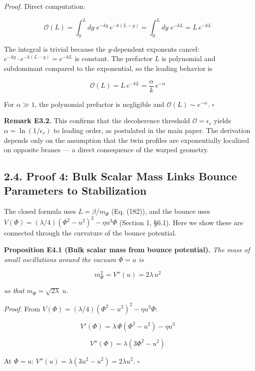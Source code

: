 \documentclass[
  11pt,
]{article}
\begin{document}
\emph{Proof.} Direct computation:

\[\mathcal{O}(L) = \int_0^L dy\;e^{-ky}\,e^{-k(L-y)} = \int_0^L dy\;e^{-kL} = L\,e^{-kL} \tag{70}\]

The integral is trivial because the \(y\)-dependent exponents cancel:
\(e^{-ky} \cdot e^{-k(L-y)} = e^{-kL}\) is constant. The prefactor \(L\)
is polynomial and subdominant compared to the exponential, so the
leading behavior is

\[\mathcal{O}(L) = L\,e^{-kL} = \frac{\alpha}{k}\,e^{-\alpha} \tag{71}\]

For \(\alpha \gg 1\), the polynomial prefactor is negligible and
\(\mathcal{O}(L) \sim e^{-\alpha}\). \(\square\)

\textbf{Remark E3.2.} This confirms that the decoherence threshold
\(\mathcal{O} = \epsilon_c\) yields \(\alpha = \ln(1/\epsilon_c)\) to
leading order, as postulated in the main paper. The derivation depends
only on the assumption that the twin profiles are exponentially
localized on opposite branes --- a direct consequence of the warped
geometry.

\bigskip

\hypertarget{proof-4-bulk-scalar-mass-links-bounce-parameters-to-stabilization}{%
\subsection{2.4. Proof 4: Bulk Scalar Mass Links Bounce Parameters to
Stabilization}\label{proof-4-bulk-scalar-mass-links-bounce-parameters-to-stabilization}}

The closed formula uses \(L = \beta/m_\Phi\) (Eq. (182)), and the bounce
uses \(V(\Phi) = (\lambda/4)(\Phi^2 - u^2)^2 - \eta u^3 \Phi\) (Section
1, §6.1). Here we show these are connected through the curvature of the
bounce potential.

\textbf{Proposition E4.1 (Bulk scalar mass from bounce potential).}
\emph{The mass of small oscillations around the vacuum \(\Phi = u\) is}

\[m_\Phi^2 = V''(u) = 2\lambda\,u^2 \tag{72}\]

\emph{so that \(m_\Phi = \sqrt{2\lambda}\;u\).}

\emph{Proof.} From
\(V(\Phi) = (\lambda/4)(\Phi^2 - u^2)^2 - \eta u^3 \Phi\):

\[V'(\Phi) = \lambda\,\Phi(\Phi^2 - u^2) - \eta u^3 \tag{73}\]

\[V''(\Phi) = \lambda(3\Phi^2 - u^2) \tag{74}\]

At \(\Phi = u\): \(V''(u) = \lambda(3u^2 - u^2) = 2\lambda u^2\).
\(\square\)
\end{document}
